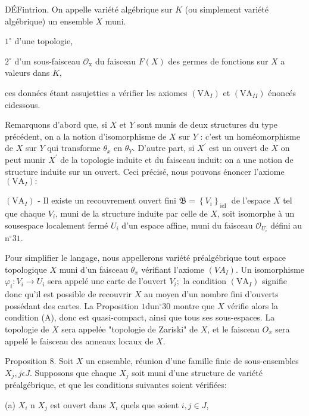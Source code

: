 DÉFintrion. On appelle variété algébrique sur $K$ (ou simplement variété algébrique) un ensemble $X$ muni.

$1^{\circ}$ d'une topologie,

$2^{\circ}$ d'un sous-faisceau $\mathcal{O}_{\mathrm{x}}$ du faisceau $F(X)$ des germes de fonctions sur $X$ a valeurs dans $K$,

ces données étant assujetties a vérifier les axiomes $\left(\mathrm{VA}_{I}\right)$ et $\left(\mathrm{VA}_{I I}\right)$ énoncés cidessous.

Remarquons d'abord que, si $X$ et $Y$ sont munis de deux structures du type précédent, on a la notion d'isomorphisme de $X$ sur $Y$ : c'est un homéomorphisme de $X$ sur $Y$ qui transforme $\theta_{x}$ en $\theta_{Y} .$ D'autre part, si $X^{\prime}$ est un ouvert de $X$ on peut munir $X^{\prime}$ de la topologie induite et du faisceau induit: on a une notion de structure induite sur un ouvert. Ceci précisé, nous pouvons énoncer l'axiome $\left(\mathrm{VA}_{I}\right):$

$\left(\mathrm{VA}_{I}\right)$ - Il existe un recouvrement ouvert fini $\mathfrak{B}=\left\{V_{i}\right\}_{\text {ieI }}$ de l'espace $X$ tel que chaque $V_{i}$, muni de la structure induite par celle de $X$, soit isomorphe à un sousespace localement fermé $U_{i}$ d'un espace affine, muni du faisceau $\mathcal{O}_{U_{i}}$ défini au $\mathrm{n}^{\circ} 31$.

Pour simplifier le langage, nous appellerons variété préalgébrique tout espace topologique $X$ muni d'un faisceau $\theta_{x}$ vérifiant l'axiome $\left(V A_{I}\right)$. Un isomorphisme $\varphi_{i}: V_{i} \rightarrow U_{i}$ sera appelé une carte de l'ouvert $V_{i} ;$ la condition $\left(\mathrm{VA}_{I}\right)$ signifie donc qu'il est possible de recouvrir $X$ au moyen d'un nombre fini d'ouverts possédant des cartes. La Proposition $1 \mathrm{du} \mathrm{n}^{\circ} 30$ montre que $X$ vérifie alors la condition (A), donc est quasi-compact, ainsi que tous ses sous-espaces. La topologie de $X$ sera appelée "topologie de Zariski" de $X$, et le faisceau $O_{x}$ sera appelé le faisceau des anneaux locaux de $X$.

Proposition 8. Soit $X$ un ensemble, réunion d'une famille finie de sous-ensembles $X_{j}, j \epsilon J .$ Supposons que chaque $X_{j}$ soit muni d'une structure de variété préalgébrique, et que les conditions suivantes soient vérifiées:

(a) $X_{i}$ n $X_{j}$ est ouvert dans $X_{i}$ quels que soient $i, j \in J$,


